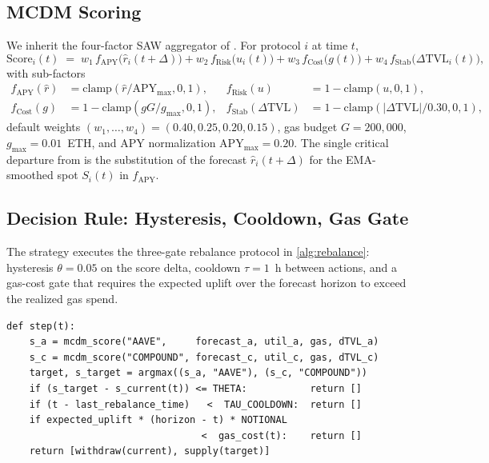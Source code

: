 \documentclass[11pt,a4paper]{article}
\begin{document}
\subsection{MCDM Scoring}
\label{sec:mcdm}

We inherit the four-factor SAW aggregator of \cite{solovev2026vault}.
For protocol $i$ at time $t$,
\begin{equation}
\mathrm{Score}_i(t) \;=\;
w_1\,f_{\mathrm{APY}}\!\bigl(\hat r_i(t+\Delta)\bigr) +
w_2\,f_{\mathrm{Risk}}\!\bigl(u_i(t)\bigr) +
w_3\,f_{\mathrm{Cost}}\!\bigl(g(t)\bigr) +
w_4\,f_{\mathrm{Stab}}\!\bigl(\Delta\mathrm{TVL}_i(t)\bigr),
\label{eq:mcdm}
\end{equation}
with sub-factors
\begin{align*}
f_{\mathrm{APY}}(\hat r) &= \mathrm{clamp}(\hat r/\mathrm{APY}_{\max},0,1),
  & f_{\mathrm{Risk}}(u) &= 1-\mathrm{clamp}(u,0,1),\\
f_{\mathrm{Cost}}(g) &= 1-\mathrm{clamp}(gG/g_{\max},0,1),
  & f_{\mathrm{Stab}}(\Delta\mathrm{TVL}) &=
  1-\mathrm{clamp}(|\Delta\mathrm{TVL}|/0.30,0,1),
\end{align*}
default weights $(w_1,\ldots,w_4)=(0.40,0.25,0.20,0.15)$, gas budget
$G=200{,}000$, $g_{\max}=0.01$~ETH, and APY normalization
$\mathrm{APY}_{\max}=0.20$. The single critical departure from
\cite{solovev2026vault} is the substitution of the forecast
$\hat r_i(t+\Delta)$ for the EMA-smoothed spot $S_i(t)$ in
$f_{\mathrm{APY}}$.

\subsection{Decision Rule: Hysteresis, Cooldown, Gas Gate}
\label{sec:decision}

The strategy executes the three-gate rebalance protocol in
\cref{alg:rebalance}: hysteresis $\theta=0.05$ on the score delta,
cooldown $\tau=1$~h between actions, and a gas-cost gate that
requires the expected uplift over the forecast horizon to exceed the
realized gas spend.

\begin{lstlisting}[caption={Predictive MCDM rebalance step (per hourly tick).},
  label={alg:rebalance}, captionpos=b]
def step(t):
    s_a = mcdm_score("AAVE",     forecast_a, util_a, gas, dTVL_a)
    s_c = mcdm_score("COMPOUND", forecast_c, util_c, gas, dTVL_c)
    target, s_target = argmax((s_a, "AAVE"), (s_c, "COMPOUND"))
    if (s_target - s_current(t)) <= THETA:           return []
    if (t - last_rebalance_time)   <  TAU_COOLDOWN:  return []
    if expected_uplift * (horizon - t) * NOTIONAL
                                  <  gas_cost(t):    return []
    return [withdraw(current), supply(target)]
\end{lstlisting}
\end{document}
